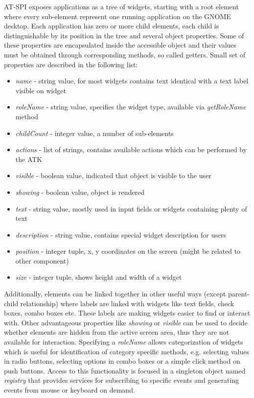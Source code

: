 AT-SPI exposes applications as a tree of widgets, starting with a root element where every sub-element represent one running application on the GNOME desktop. Each application has zero or more child elements, each child is distinguishable by its position in the tree and several object properties. Some of these properties are encapsulated inside the accessible object and their values must be obtained through corresponding methods, so called getters. Small set of properties are described in the following list:
\begin{itemize}
    \item \textit{name} - string value, for most widgets contains text identical with a text label visible on widget
    \item \textit{roleName} - string value, specifies the widget type, available via \textit{getRoleName} method
    \item \textit{childCount} - integer value, a number of sub-elements 
    \item \textit{actions} - list of strings, contains available actions which can be performed by the ATK
    \item \textit{visible} - boolean value, indicated that object is visible to the user
    \item \textit{showing} - boolean value, object is rendered
    \item \textit{text} - string value, mostly used in input fields or widgets containing plenty of text
    \item \textit{description} - string value, contains special widget description for users
    \item \textit{position} - integer tuple, x, y coordinates on the screen (might be related to other component)
    \item \textit{size} - integer tuple, shows height and width of a widget
\end{itemize}

Additionally, elements can be linked together in other useful ways (except parent-child relationship) where labels are linked with widgets like text fields, check boxes, combo boxes etc. These labels are making widgets easier to find or interact with. Other advantageous properties like \textit{showing} or \textit{visible} can be used to decide whether elements are hidden from the active screen area, thus they are not available for interaction. Specifying a \textit{roleName} allows categorization of widgets which is useful for identification of category specific methods, e.g. selecting values in radio buttons, selecting options in combo boxes or a simple click method on push buttons. Access to this functionality is focused in a singleton object named \textit{registry} that provides services for subscribing to specific events and generating events from mouse or keyboard on demand.


